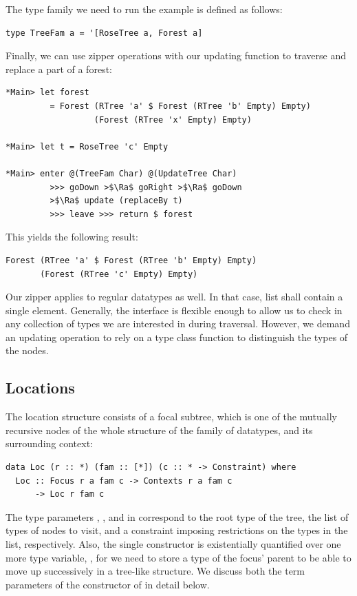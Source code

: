 \documentclass[sigplan,screen,review,anonymous]{acmart}
\begin{document}
The type family we need to run the example is defined as follows:
\begin{lstlisting}[style=fancy]
type TreeFam a = '[RoseTree a, Forest a]
\end{lstlisting}

Finally, we can use zipper operations with our updating function to traverse and replace a part of a forest:
\begin{lstlisting}[style=ttstyle]
*Main> let forest
         = Forest (RTree 'a' $ Forest (RTree 'b' Empty) Empty)
                  (Forest (RTree 'x' Empty) Empty)

*Main> let t = RoseTree 'c' Empty

*Main> enter @(TreeFam Char) @(UpdateTree Char)
         >>> goDown >$\Ra$ goRight >$\Ra$ goDown
         >$\Ra$ update (replaceBy t)
         >>> leave >>> return $ forest
\end{lstlisting}
This yields the following result:
\begin{lstlisting}[style=fancy]
Forest (RTree 'a' $ Forest (RTree 'b' Empty) Empty)
       (Forest (RTree 'c' Empty) Empty)
\end{lstlisting}

Our zipper applies to regular datatypes as well. In that case,  list shall contain a single element. Generally, the interface is flexible enough to allow us to check in any collection of types we are interested in during traversal. However, we demand an updating operation to rely on a type class function to distinguish the types of the nodes.

\subsection{Locations}
\label{ss:locs}

The location structure consists of a focal subtree, which is one of the mutually recursive nodes of the whole structure of the family of datatypes, and its surrounding context:
\begin{lstlisting}[style=fancy]
data Loc (r :: *) (fam :: [*]) (c :: * -> Constraint) where
  Loc :: Focus r a fam c -> Contexts r a fam c
      -> Loc r fam c
\end{lstlisting}
The type parameters , , and  in  correspond to the root type of the tree, the list of types of nodes to visit, and a constraint imposing restrictions on the types in the list, respectively. Also, the single constructor is existentially quantified over one more type variable, , for we need to store a type of the focus' parent to be able to move up successively in a tree-like structure. We discuss both the term parameters of the constructor of  in detail below. 
\end{document}
